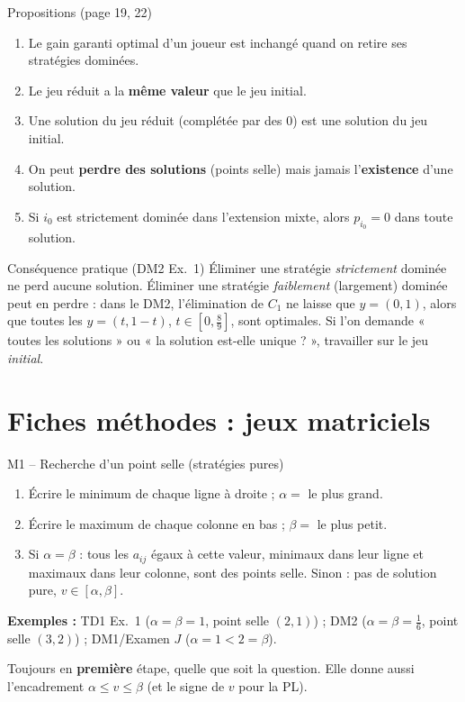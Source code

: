 \documentclass[11pt,a4paper]{article}
\begin{document}
\begin{propbox}{Propositions (page 19, 22)}
\begin{enumerate}[leftmargin=*]
\item Le gain garanti optimal d'un joueur est inchangé quand on retire ses stratégies dominées.
\item Le jeu réduit a la \textbf{même valeur} que le jeu initial.
\item Une solution du jeu réduit (complétée par des 0) est une solution du jeu initial.
\item On peut \textbf{perdre des solutions} (points selle) mais jamais l'\textbf{existence} d'une solution.
\item Si $i_0$ est strictement dominée dans l'extension mixte, alors $p_{i_0}=0$ dans toute solution.
\end{enumerate}
\end{propbox}

\begin{rembox}{Conséquence pratique (DM2 Ex.~1)}
Éliminer une stratégie \emph{strictement} dominée ne perd aucune solution. Éliminer une stratégie \emph{faiblement} (largement) dominée peut en perdre : dans le DM2, l'élimination de $C_1$ ne laisse que $y=(0,1)$, alors que toutes les $y=(t,1-t)$, $t\in[0,\frac89]$, sont optimales. Si l'on demande « toutes les solutions » ou « la solution est-elle unique ? », travailler sur le jeu \emph{initial}.
\end{rembox}

\section{Fiches méthodes : jeux matriciels}\label{sec:methodes}

\begin{methbox}{M1 -- Recherche d'un point selle (stratégies pures)}
\begin{enumerate}[leftmargin=*]
\item Écrire le minimum de chaque ligne à droite ; $\alpha=$ le plus grand.
\item Écrire le maximum de chaque colonne en bas ; $\beta=$ le plus petit.
\item Si $\alpha=\beta$ : tous les $a_{ij}$ égaux à cette valeur, minimaux dans leur ligne et maximaux dans leur colonne, sont des points selle. Sinon : pas de solution pure, $v\in[\alpha,\beta]$.
\end{enumerate}
\textbf{Exemples :} TD1 Ex.~1 ($\alpha=\beta=1$, point selle $(2,1)$) ; DM2 ($\alpha=\beta=\frac16$, point selle $(3,2)$) ; DM1/Examen $J$ ($\alpha=1<2=\beta$).
\end{methbox}
\begin{whenbox}
Toujours en \textbf{première} étape, quelle que soit la question. Elle donne aussi l'encadrement $\alpha\le v\le\beta$ (et le signe de $v$ pour la PL).
\end{whenbox}
\end{document}
